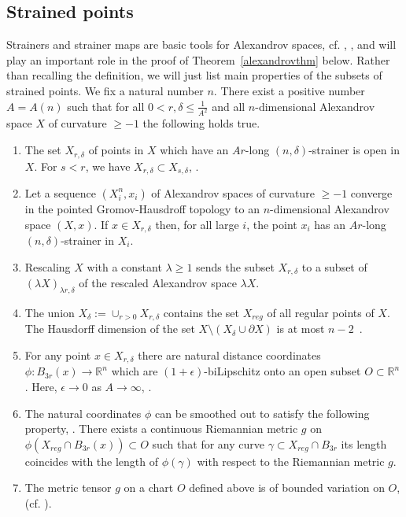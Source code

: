 \documentclass[12pt,leqno]{amsart}
\numberwithin{equation}{section}
\theoremstyle{definition}
\theoremstyle{remark}
\newcommand{\tref}[1]{Theorem~\ref{#1}}
\newcommand{\R}{\mathbb{R}}
\begin{document}
\subsection{Strained points}  \label{subsec:strainer}
  Strainers and strainer maps are basic tools for Alexandrov spaces, cf. \cite{BGP},  \cite{Otsu-Shioya}, \cite{Shioya} and will play an important role in the proof of \tref{alexandrovthm} below. Rather than recalling the definition, we will just list main properties of the subsets of strained points.  We fix a natural number $n$.
There exist a positive number $A=A(n)$ such that for   all $0<r,\delta \leq  \frac 1 {A^2}$ and all $n$-dimensional Alexandrov space $X$ of curvature $\geq -1$ the following holds true.
\begin{enumerate}

\item The set $X_{r,\delta}$ of points in $X$ which have an $Ar$-long $(n,\delta)$-strainer is   open in $X$.  For $s<r$, we have $X_{r,\delta} \subset X_{s,\delta}$,  \cite[9.7]{BGP}.

\item Let a sequence    $(X_i ^n,x_i)$ of Alexandrov spaces  of curvature $\geq -1$ converge in the pointed Gromov-Hausdroff topology to an $n$-dimensional Alexandrov space $(X,x)$.
If $x\in X_{r,\delta}$ then, for all large $i$, the point $x_i$ has an $Ar$-long  $(n, \delta)$-strainer in $X_i$.

 \item Rescaling $X$ with a constant $\lambda \geq 1$ sends the subset $X_{r,\delta}$ to a subset of $(\lambda X )_{\lambda r, \delta} $ of the rescaled Alexandrov space $\lambda X$.

\item The union $X_{\delta}:= \cup _{r>0}  X_{r,\delta}$ contains the set $X_{reg}$ of all regular points of $X$. The Hausdorff dimension of the set $X\setminus (X_{\delta} \cup \partial X)$ is at most $n-2$~\cite[10.6, 10.6.1, 12.8]{BGP}.

\item    For any point $x\in X_{r,\delta}$ there are natural distance coordinates $\phi: B_{3r} (x) \to \R^n$ which are $(1+\epsilon)$-biLipschitz onto an open subset $O \subset \R^n$.  Here, $\epsilon\to 0$ as $A\to\infty$, \cite[9.4]{BGP}.

\item The natural coordinates $\phi$ can be smoothed out to satisfy the following property, \cite[Theorem B]{Otsu-Shioya}.  There exists a continuous Riemannian metric  $g$ on $\phi (X_{reg} \cap B_{3r} (x)) \subset O$  such  that for any curve $\gamma \subset X_{reg} \cap B_{3r} $ its length
  coincides with  the length of $\phi (\gamma )$  with respect to the Riemannian metric $g$.

\item  The metric tensor $g$ on a chart $O$ defined above is of bounded variation on $O$, \cite[4.2]{Per-DC} (cf. \cite{AB15}).
    \end{enumerate}
\end{document}
